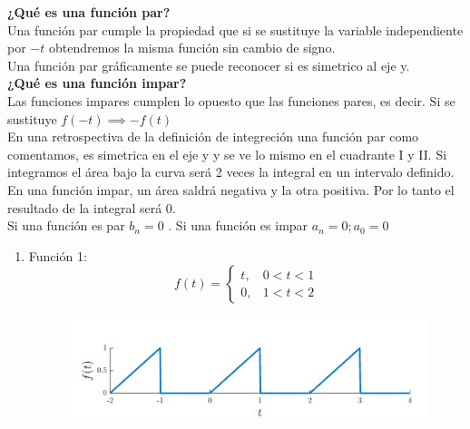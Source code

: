 \documentclass[
	12pt, %
]{fphw}
\begin{document}
\textbf{¿Qué es una función par?}\\

Una función par cumple la propiedad que si se sustituye la variable independiente por $-t$ obtendremos la misma función sin cambio de signo.\\
Una función par gráficamente se puede reconocer si es simetrico al eje y. \\

\textbf{¿Qué es una función impar?}\\

Las funciones impares cumplen lo opuesto que las funciones pares, es decir. Si se sustituye $f(-t) \implies -f(t)$ \\
En una retrospectiva de la definición de integreción una función par como comentamos, es simetrica en el eje y y se ve lo mismo en el cuadrante I y II. Si integramos el área bajo la curva será 2 veces la integral en un intervalo definido.\\
En una función impar, un área saldrá negativa y la otra positiva. Por lo tanto el resultado de la integral será 0.\\
Si una función es par $b_{n}=0$ . Si una función es impar $a_{n}=0; a_{0}=0$

\newpage
\begin{enumerate}
  \setcounter{enumi}{0}
\item Función 1: \\
  \[f(t) =\left\{ \begin{array}{lr}t, & 0 < t < 1 \\0, & 1 < t < 2 \end{array}\right.\]

  \begin{figure}[H]
    \centering
    \includegraphics[scale=0.5]{images/funcion_one.jpg}
  \end{figure}
  
\end{enumerate}
\end{document}
